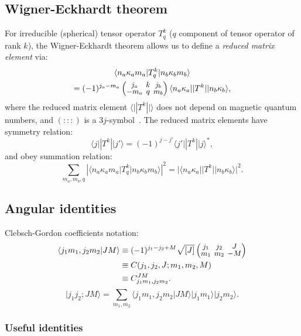 \documentclass[10pt,twocolumn,a4paper]{article}%
\newcommand{\bra}[1]{\ensuremath{\langle #1|}}	%
\newcommand{\ket}[1]{\ensuremath{|#1\rangle}}
\newcommand{\braket}[1]{\ensuremath{\langle #1\rangle}}	%
\newcommand{\threej}[6]{
\renewcommand\arraystretch{0.75}\setlength\arraycolsep{2pt}
\small\ensuremath{\begin{pmatrix}#1&#2&#3\\#4&#5&#6\end{pmatrix}}
}	%
\newcommand{\be}{\begin{equation}}
\newcommand{\ee}{\end{equation}}
\renewcommand{\k}{\ensuremath{\kappa}}
\begin{document}
\subsection{Wigner-Eckhardt theorem}
For irreducible (spherical) tensor operator $T^k_q$ ($q$ component of tensor operator of rank $k$), the Wigner-Eckhardt theorem allows us to define a {\em reduced matrix element} via:
\begin{multline}
\bra{n_a \k_a m_a}T^k_q\ket{n_b \k_b m_b} \\= (-1)^{j_a-m_a}\threej{j_a}{k}{j_b}{-m_a}{q}{m_b} \bra{n_a \k_a}|T^k|\ket{n_b \k_b},
\end{multline}
where the reduced matrix element $\bra{}|T^k|\ket{}$ does not depend on magnetic quantum numbers, and $\left(:::\right)$ is a $3j$-symbol~\cite{Varshalovich1988}.
The reduced matrix elements have symmetry relation:
\be
\bra{j}|T^k|\ket{j'} = (-1)^{j-j'}\bra{j'}|T^k|\ket{j}^*,
\ee
and obey summation relation:
\be
\sum_{m_a,m_b,q} |\bra{n_a \k_a m_a}T^k_q\ket{n_b \k_b m_b}|^2 = |\bra{n_a \k_a}|T^k|\ket{n_b \k_b}|^2.
\ee
%

\subsection{Angular identities}


Clebsch-Gordon coefficients notation:
\begin{align}
\braket{j_1 m_1,j_2m_2|JM} &\equiv (-1)^{j_1-j_2+M}\sqrt{[J]}\threej{j_1}{j_2}{J}{m_1}{m_2}{-M}\\
&\equiv C(j_1,j_2,J; m_1, m_2, M)\\
&\equiv C^{JM}_{j_1m_1,j_2m_2}.
\end{align}
\be
\ket{j_1 j_2;JM} =\sum_{m_1,m_2} \braket{j_1 m_1,j_2m_2|JM} \ket{j_1m_1}\ket{j_2m_2}.
\ee


\subsubsection*{Useful identities}


\end{document}
